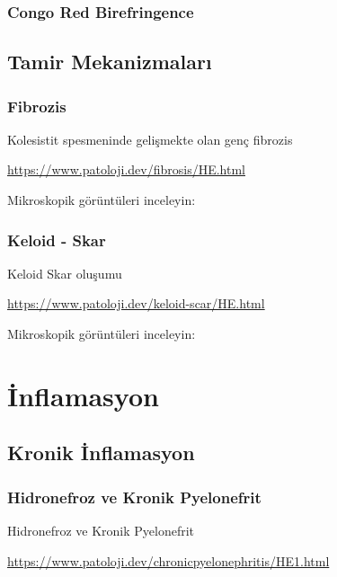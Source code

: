 \documentclass[
  letterpaper,
  DIV=11,
  numbers=noendperiod]{scrreprt}
\begin{document}
\hypertarget{congo-red-birefringence}{%
\section{Congo Red Birefringence}\label{congo-red-birefringence}}

\hypertarget{tamir-mekanizmalarux131}{%
\chapter{Tamir Mekanizmaları}\label{tamir-mekanizmalarux131}}

\hypertarget{fibrozis}{%
\section{Fibrozis}\label{fibrozis}}

Kolesistit spesmeninde gelişmekte olan genç fibrozis

\url{https://www.patoloji.dev/fibrosis/HE.html}

Mikroskopik görüntüleri inceleyin:

\hypertarget{keloid---skar}{%
\section{Keloid - Skar}\label{keloid---skar}}

Keloid Skar oluşumu

\url{https://www.patoloji.dev/keloid-scar/HE.html}

Mikroskopik görüntüleri inceleyin:

\part{İnflamasyon}

\hypertarget{kronik-inflamasyon}{%
\chapter{Kronik İnflamasyon}\label{kronik-inflamasyon}}

\hypertarget{hidronefroz-ve-kronik-pyelonefrit}{%
\section{Hidronefroz ve Kronik
Pyelonefrit}\label{hidronefroz-ve-kronik-pyelonefrit}}

Hidronefroz ve Kronik Pyelonefrit

\url{https://www.patoloji.dev/chronicpyelonephritis/HE1.html}
\end{document}
